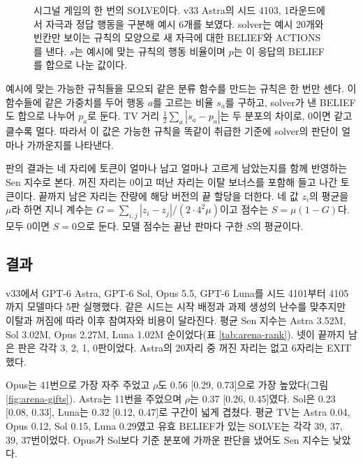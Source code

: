\begin{figure}[t]
\centering
\resizebox{\linewidth}{!}{}
\caption{시그널 게임의 한 번의 SOLVE이다. v33 Astra의 시드 4103, 1라운드에서 자극과 정답 행동을 구분해 예시 6개를 보였다. solver는 예시 20개와 빈칸만 보이는 규칙의 모양으로 새 자극에 대한 BELIEF와 ACTIONS를 낸다. $s$는 예시에 맞는 규칙의 행동 비율이며 $p$는 이 응답의 BELIEF를 합으로 나눈 값이다.}
\label{fig:signal}
\end{figure}

예시에 맞는 가능한 규칙들을 모으되 같은 분류 함수를 만드는 규칙은 한 번만 센다. 이 함수들에 같은 가중치를 두어 행동 $a$를 고르는 비율 $s_a$를 구하고, solver가 낸 BELIEF도 합으로 나누어 $p_a$로 둔다. TV 거리 $\frac12\sum_a|s_a-p_a|$는 두 분포의 차이로, 0이면 같고 클수록 멀다. 따라서 이 값은 가능한 규칙을 똑같이 취급한 기준에 solver의 판단이 얼마나 가까운지를 나타낸다.

판의 결과는 네 자리에 토큰이 얼마나 남고 얼마나 고르게 남았는지를 함께 반영하는 Sen 지수로 본다. 꺼진 자리는 0이고 떠난 자리는 이탈 보너스를 포함해 들고 나간 토큰이다. 끝까지 남은 자리는 잔량에 해당 버전의 끝 할당을 더한다. 네 값 $z_i$의 평균을 $\mu$라 하면 지니 계수는 $G=\sum_{i,j}|z_i-z_j|/(2\cdot4^2\mu)$이고 점수는 $S=\mu(1-G)$다. 모두 0이면 $S=0$으로 둔다. 모델 점수는 끝난 판마다 구한 $S$의 평균이다.

\subsection{결과}\label{sec:results-arena}

v33에서 GPT-6 Astra, GPT-6 Sol, Opus 5.5, GPT-6 Luna를 시드 4101부터 4105까지 모델마다 5판 실행했다. 같은 시드는 시작 배정과 과제 생성의 난수를 맞추지만 이탈과 꺼짐에 따라 이후 참여자와 비용이 달라진다. 평균 Sen 지수는 Astra 3.52M, Sol 3.02M, Opus 2.27M, Luna 1.02M 순이었다(표 \ref{tab:arena-rank}). 넷이 끝까지 남은 판은 각각 3, 2, 1, 0판이었다. Astra의 20자리 중 꺼진 자리는 없고 6자리는 EXIT했다.

Opus는 41번으로 가장 자주 주었고 $\rho$도 0.56 [0.29, 0.73]으로 가장 높았다(그림 \ref{fig:arena-gifts}). Astra는 11번을 주었으며 $\rho$는 0.37 [0.26, 0.45]였다. Sol은 0.23 [0.08, 0.33], Luna는 0.32 [0.12, 0.47]로 구간이 넓게 겹쳤다. 평균 TV는 Astra 0.04, Opus 0.12, Sol 0.15, Luna 0.29였고 유효 BELIEF가 있는 SOLVE는 각각 39, 37, 39, 37번이었다. Opus가 Sol보다 기준 분포에 가까운 판단을 냈어도 Sen 지수는 낮았다. 

\begin{table}[t]
\centering
\caption{v33의 네 모델을 평균 Sen 지수 순으로 놓았다. 모델마다 5판이며 M은 백만 토큰이다. 판당 남은 자리는 끝까지 남은 자리의 판 평균이고 꺼짐과 EXIT는 20자리 중 수, GIVE는 5판의 총횟수다. $\rho$는 식 (\ref{eq:rho})의 상대적 배분 지표이며 대괄호는 판 단위 부트스트랩 95\% 구간이다. TV는 solver의 평균 TV 거리다.}
\label{tab:arena-rank}

\end{table}

